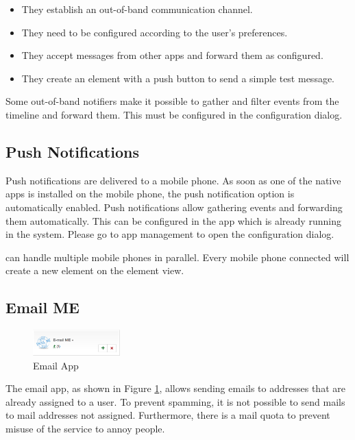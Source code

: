 \begin{itemize}
\item They establish an out-of-band communication channel.
\item They need to be configured according to the user’s preferences.
\item They accept messages from other apps and forward them as configured.
\item They create an element with a push button to send a simple test message.
\end{itemize}

Some out-of-band notifiers make it possible to gather and filter events from the timeline 
and forward them. This must be configured in the configuration dialog.

\subsection{Push Notifications}

Push notifications are delivered to a mobile phone. As soon as one of the native \zway 
apps is installed on the mobile phone, the push notification option is automatically 
enabled. Push notifications allow gathering events and forwarding them automatically. This 
can be configured in the app  which is already running in the 
system. Please go to  app management to open the configuration dialog.

 can handle multiple mobile phones in parallel. Every mobile 
phone connected will create a new element on the element view.

\subsection{Email ME}

\begin{figure}
\begin{center}
\includegraphics[width=0.3\textwidth]{pngs/cap6/app31.png}
\caption{Email App}
\label{app31}
\end{center}
\end{figure}

The email app, as shown in Figure \ref{app31}, allows sending emails to addresses that 
are already assigned to a user. To prevent spamming, it is not possible to send mails to 
mail addresses not assigned. Furthermore, there is a mail quota to prevent misuse of 
the service to annoy people.

